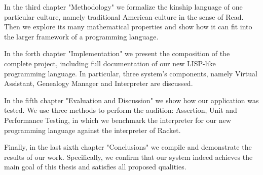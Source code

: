     In the third chapter "Methodology" we formalize the kinship language of one particular culture, namely traditional American
    culture in the sense of Read\cite{read}. Then we explore its many mathematical properties and show how it can fit into the larger
    framework of a programming language.

    In the forth chapter "Implementation" we present the composition of the complete project, including full documentation of our new
    LISP-like programming language. In particular, three system's components, namely Virtual Assistant, Genealogy Manager and
    Interpreter are discussed.

    In the fifth chapter "Evaluation and Discussion" we show how our application was tested. We use three methods to perform the
    audition: Assertion, Unit and Performance Testing, in which we benchmark the interpreter for our new programming language against
    the interpreter of Racket.

    Finally, in the last sixth chapter "Conclusions" we compile and demonstrate the results of our work. Specifically, we confirm that
    our system indeed achieves the main goal of this thesis and satisfies all proposed qualities.
